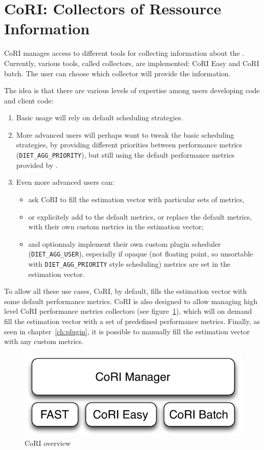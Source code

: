 \section{CoRI: Collectors of Ressource Information}
\label{sec:CORI}

CoRI manages access to different tools for collecting information about the
\sed. Currently, various tools, called collectors, are implemented: CoRI
Easy and CoRI batch. The user can choose which collector will provide the
information.

The idea is that there are various levels of expertise among users developing
\sed code and \diet client code:
\begin{enumerate}
\item Basic usage will rely on default scheduling strategies.
\item More advanced users will perhaps want to tweak the basic scheduling
  strategies, by providing different priorities between performance metrics
  (\verb+DIET_AGG_PRIORITY+), but still using the default performance metrics
  provided by \diet.
\item Even more advanced users can:
\begin{itemize}
\item ask CoRI to fill the estimation vector with particular sets of metrics,
\item or explicitely add to the default metrics, or replace the default
  metrics, with their own custom metrics in the estimation vector;
\item and optionnaly implement their own custom plugin scheduler
  (\verb+DIET_AGG_USER+), especially if opaque (not floating point, so
  unsortable with \verb+DIET_AGG_PRIORITY+ style scheduling) metrics are set in
  the estimation vector.
\end{itemize}
\end{enumerate}

To allow all these use cases, CoRI, by default, fills the estimation vector
with some default performance metrics. CoRI is also designed to allow managing
high level CoRI performance metrics collectors (see
figure~\ref{fig:cori-overview}), which will on demand fill the estimation
vector with a set of predefined performance metrics. Finally, as seen in
chapter~\ref{ch:plugin}, it is possible to manually fill the estimation vector
with any custom metrics.

\begin{figure}[h]
  \begin{center}
    \includegraphics[scale=0.5]{fig/overviewCori}
    \caption{CoRI overview}
    \label{fig:cori-overview}
  \end{center}
\end{figure}

